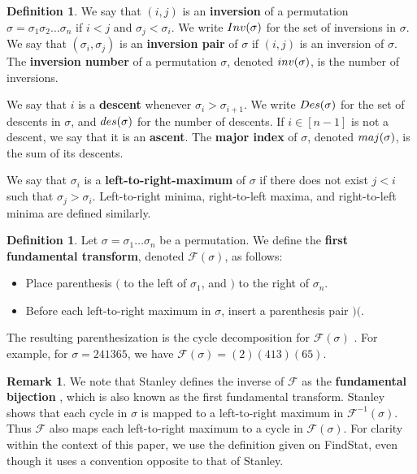 \documentclass{amsart}
\theoremstyle{definition}
\newtheorem{definition}[thm]{Definition}
\newtheorem{remark}[thm]{Remark}
\newcommand{\inv}{\textnormal{inv}}
\newcommand{\Inv}{\textnormal{Inv}}
\newcommand{\maj}{\textnormal{maj}}
\newcommand{\Des}{\textnormal{Des}}
\newcommand{\des}{\textnormal{des}}
\begin{document}
\begin{definition}
  \label{def:common_stats}
  We say that $(i,j)$ is an \textbf{inversion} of a permutation $\sigma=\sigma_1\sigma_2\ldots\sigma_n$ if $i<j$ and $\sigma_j < \sigma_i$. We write $\Inv(\sigma)$ for the set of inversions in $\sigma$. We say that $(\sigma_i, \sigma_j)$ is an \textbf{inversion pair} of $\sigma$ if $(i, j)$ is an inversion of $\sigma$. The \textbf{inversion number} of a permutation $\sigma$, denoted $\inv(\sigma)$, is the number of inversions.

  We say that $i$ is a \textbf{descent} whenever $\sigma_i > \sigma_{i+1}$. We write $\Des(\sigma)$ for the set of descents in $\sigma$, and $\des(\sigma)$ for the number of descents.  If $i \in [n-1]$ is not a descent, we say that it is an \textbf{ascent}.
  The \textbf{major index} of $\sigma$, denoted $\maj(\sigma)$, is the sum of its descents.

  We say that $\sigma_i$ is a \textbf{left-to-right-maximum} of $\sigma$ if there does not exist $j<i$
  such that $\sigma_j>\sigma_i$. Left-to-right minima, right-to-left maxima, and right-to-left minima are defined similarly.
\end{definition}




\begin{definition}\label{def:fund_transform}
  Let $\sigma = \sigma_1 \ldots \sigma_n$ be a permutation. We define the \textbf{first fundamental transform}, denoted $\mathcal{F}(\sigma)$, as follows:
  \begin{itemize}
    \item Place parenthesis $($ to the left of $\sigma_1$, and $)$ to the right of $\sigma_n$.
    \item Before each left-to-right maximum in $\sigma$, insert a parenthesis pair $)($.
  \end{itemize}
  The resulting parenthesization is the cycle decomposition for $\mathcal{F}(\sigma)$ \cite{findstat}. For example, for $\sigma = 241365$, we have $\mathcal{F}(\sigma)=(2)(413)(65)$.
\end{definition}

\begin{remark}\label{remark:fund_bij}
  We note that Stanley defines the inverse of $\mathcal{F}$ as the \textbf{fundamental bijection} \cite[Page 23]{Stanley2011}, which is also known as the first fundamental transform.
  Stanley shows that each cycle in $\sigma$ is mapped to a left-to-right maximum in $\mathcal{F}^{-1}(\sigma)$. Thus $\mathcal{F}$ also maps each left-to-right maximum to a cycle in $\mathcal{F}(\sigma)$. 
  For clarity within the context of this paper, we use the definition given on FindStat, even though it uses a convention opposite to that of Stanley.
\end{remark}
\end{document}
